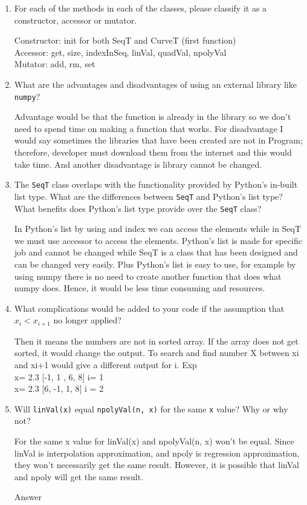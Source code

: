 \documentclass[12pt]{article}
\begin{document}
\begin{enumerate}

\item For each of the methods in each of the classes, please classify it as a
  constructor, accessor or mutator.

Constructor: init for both SeqT and CurveT (first function)\\
        Accessor: get, size, indexInSeq, linVal, quadVal, npolyVal\\
        Mutator: add, rm, set


\item What are the advantages and disadvantages of using an external library
  like \texttt{numpy}?

Advantage would be that the function is already in the library so we don't need to spend time on making a function that works. For disadvantage I would say sometimes the libraries that have been created are not in Program; therefore, developer must download them from the internet and this would take time. And another disadvantage is library cannot be changed.

\item The \texttt{SeqT} class overlaps with the functionality provided by
  Python's in-built list type.  What are the differences between \texttt{SeqT}
  and Python's list type?  What benefits does Python's list type provide over
  the \texttt{SeqT} class?

In Python’s list by using and index we can access the elements while in SeqT we must use accessor to access the elements. Python's list is made for specific job and cannot be changed while SeqT is a class that has been designed and can be changed very easily. Plus Python's list is easy to use, for example by using numpy there is no need to create another function that does what numpy does. Hence, it would be less time consuming and resources.

\item What complications would be added to your code if the assumption that
  $x_i < x_{i+1}$ no longer applied?

Then it means the numbers are not in sorted array. If the array does not get sorted, it would change the output. To search and find number X between xi and xi+1 would give a different output for i. Exp \\ 
x= 2.3    [-1, 1 , 6, 8]  i= 1 \\
x= 2.3    [6, -1, 1, 8]   i = 2


\item Will \texttt{linVal(x)} equal \texttt{npolyVal(n, x)} for the same \texttt{x}
  value?  Why or why not?
  
For the same x value for linVal(x) and npolyVal(n, x) won't be equal. Since linVal is interpolation approximation, and npoly is regression approximation, they won't necessarily get the same result. However, it is possible that linVal and npoly will get the same result.


Answer
\end{enumerate}
\end{document}
